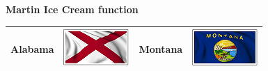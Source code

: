 \documentclass{ximera}
\begin{document}
\textbf{Martin Ice Cream function} \\

\begin{center}

\begin{tabular}{|l|l|l|l|}
\hline
Alabama & \includegraphics{pics/StateFlags/Alabama.png} & Montana & \includegraphics{pics/StateFlags/Montana.png} \\\hline 






\end{tabular}

\end{center}

\quad \\
\end{document}
